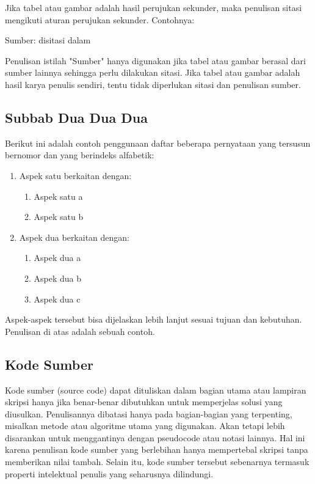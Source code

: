 Jika tabel atau gambar adalah hasil perujukan sekunder, maka penulisan sitasi mengikuti aturan perujukan sekunder. Contohnya:
\begin{displayquote}
  Sumber: \cite{anggariawan:2014} disitasi dalam \cite{Bloggs1950}
\end{displayquote}

Penulisan istilah "Sumber" hanya digunakan jika tabel atau gambar berasal dari sumber lainnya sehingga perlu dilakukan sitasi. Jika tabel atau gambar adalah hasil karya penulis sendiri, tentu tidak diperlukan sitasi dan penulisan sumber.

\subsection{Subbab Dua Dua Dua}

Berikut ini adalah contoh penggunaan daftar beberapa pernyataan yang tersusun bernomor dan yang berindeks alfabetik:

\begin{enumerate}
  \item Aspek satu berkaitan dengan: 
  \begin{enumerate}[label=\alph*.]
    \item Aspek satu a
    \item Aspek satu b 
  \end{enumerate}
  \item Aspek dua berkaitan dengan: 
  \begin{enumerate}[label=\alph*.]
    \item Aspek dua a
    \item Aspek dua b
    \item Aspek dua c 
  \end{enumerate}
\end{enumerate}

Aspek-aspek tersebut bisa dijelaskan lebih lanjut sesuai tujuan dan kebutuhan. Penulisan di atas adalah sebuah contoh. 

\subsection{Kode Sumber}

Kode sumber (source code) dapat dituliskan dalam bagian utama atau lampiran skripsi hanya jika benar-benar dibutuhkan untuk memperjelas solusi yang diusulkan. Penulisannya dibatasi hanya pada bagian-bagian yang terpenting, misalkan metode atau algoritme utama yang digunakan. Akan tetapi lebih disarankan untuk menggantinya dengan pseudocode atau notasi lainnya. Hal ini karena penulisan kode sumber yang berlebihan hanya mempertebal skripsi tanpa memberikan nilai tambah. Selain itu, kode sumber tersebut sebenarnya termasuk properti intelektual penulis yang seharusnya dilindungi. 

